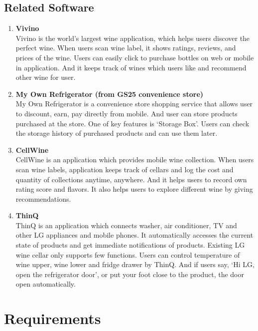 \documentclass[sigconf, nonacm]{acmart}
\begin{document}
\noindent \subsection{Related Software}
\begin{enumerate}
    \item {\textbf{Vivino}}\\
    Vivino is the world’s largest wine application, which helps users discover the perfect wine. When users scan wine label, it shows ratings, reviews, and prices of the wine. Users can easily click to purchase bottles on web or mobile in application. And it keeps track of wines which users like and recommend other wine for user.\\
    \item {\textbf{My Own Refrigerator (from GS25 convenience store)}}\\
    My Own Refrigerator is a convenience store shopping service that allows user to discount, earn, pay directly from mobile. And user can store products purchased at the store. One of key features is ‘Storage Box’. Users can check the storage history of purchased products and can use them later.\\
    \item {\textbf{CellWine}}\\
    CellWine is an application which provides mobile wine collection. When users scan wine labels, application keeps track of cellars and log the cost and quantity of collections anytime, anywhere. And it helps users to record own rating score and flavors. It also helps users to explore different wine by giving recommendations.\\
    \item {\textbf{ThinQ}}\\
    ThinQ is an application which connects washer, air conditioner, TV and other LG appliances and mobile phones. It automatically accesses the current state of products and get immediate notifications of products. Existing LG wine cellar only supports few functions. Users can control temperature of wine upper, wine lower and fridge drawer by ThinQ. And if users say, ‘Hi LG, open the refrigerator door’, or put your foot close to the product, the door open automatically.
\end{enumerate}

\section{Requirements}
\end{document}

